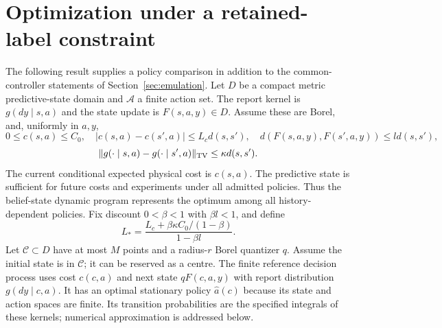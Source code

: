 \section{Optimization under a retained-label constraint}
\label{sec:v2-control}
The following result supplies a policy comparison in addition to the
common-controller statements of Section~\ref{sec:emulation}. Let $D$ be
a compact metric predictive-state domain and $\mathcal A$ a finite action
set. The report kernel is $g(dy\mid s,a)$ and the state update is
$F(s,a,y)\in D$. Assume these are Borel, and, uniformly in $a,y$,
\[
 0\le c(s,a)\le C_0,\quad
 |c(s,a)-c(s',a)|\le L_c d(s,s'),\quad
 d(F(s,a,y),F(s',a,y))\le l d(s,s'),
\]
\[
 \|g(\cdot\mid s,a)-g(\cdot\mid s',a)\|_{\mathrm{TV}}\le\kappa d(s,s').
\]
The current conditional expected physical cost is $c(s,a)$. The predictive
state is sufficient for future costs and experiments under all admitted
policies. Thus the belief-state dynamic program represents the optimum
among all history-dependent policies. Fix discount $0<\beta<1$ with
$\beta l<1$, and define
\[
 L_* =\frac{L_c+\beta\kappa C_0/(1-\beta)}{1-\beta l}.
\]
Let $\mathcal C\subset D$ have at most $M$ points and a radius-$r$ Borel
quantizer $q$. Assume the initial state is in $\mathcal C$; it can be
reserved as a centre. The finite reference decision process uses cost
$c(c,a)$ and next state $qF(c,a,y)$ with report distribution $g(dy\mid c,a)$.
It has an optimal stationary policy $\widehat a(c)$ because its state and
action spaces are finite. Its transition probabilities are the specified
integrals of these kernels; numerical approximation is addressed below.


